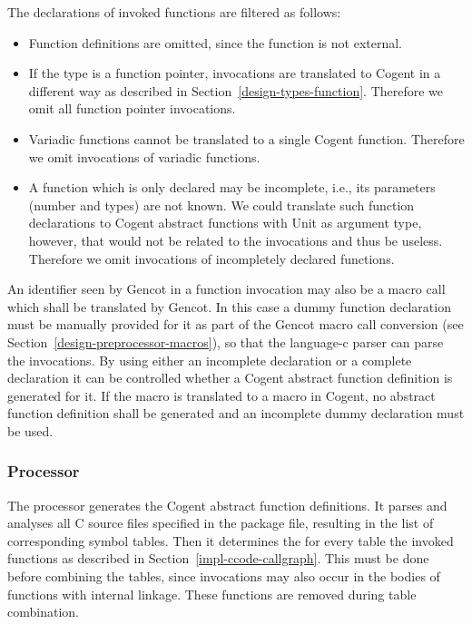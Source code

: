 The declarations of invoked functions are filtered as follows:
\begin{itemize}
\item Function definitions are omitted, since the function is not external.
\item If the type is a function pointer, invocations are translated to Cogent in a different way as 
described in Section~\ref{design-types-function}. Therefore we omit all function pointer invocations.
\item Variadic functions cannot be translated to a single Cogent function. Therefore we omit invocations of
variadic functions.
\item A function which is only declared may be incomplete, i.e., its parameters (number and types) are not known. 
We could translate such function declarations to Cogent abstract functions with Unit as argument type, however,
that would not be related to the invocations and thus be useless. Therefore we omit invocations
of incompletely declared functions.
\end{itemize}

An identifier seen by Gencot in a function invocation may also be a macro call which shall be translated by Gencot. 
In this case a dummy function declaration must be manually provided for it as part of the Gencot macro call conversion
(see Section~\ref{design-preprocessor-macros}), so that the language-c parser can parse the invocations. By 
using either an incomplete declaration or a complete declaration it can be controlled whether a Cogent abstract 
function definition is generated for it. If the macro is translated to a macro in Cogent, no abstract function
definition shall be generated and an incomplete dummy declaration must be used.

\subsubsection{Processor }

The processor  generates the Cogent abstract function definitions. It parses and analyses
all C source files specified in the package file, resulting in the list of corresponding symbol tables. Then
it determines the for every table the invoked functions as described in Section~\ref{impl-ccode-callgraph}. This must
be done before combining the tables, since invocations may also occur in the bodies of functions with internal
linkage. These functions are removed during table combination.

